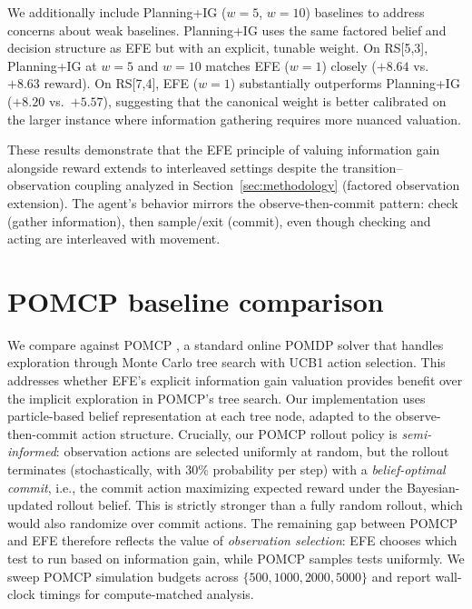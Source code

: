 \documentclass[runningheads]{llncs}
\begin{document}
We additionally include Planning+IG ($w{=}5$, $w{=}10$) baselines to address concerns about weak baselines. Planning+IG uses the same factored belief and decision structure as EFE but with an explicit, tunable weight. On RS[5,3], Planning+IG at $w{=}5$ and $w{=}10$ matches EFE ($w{=}1$) closely ($+8.64$ vs.\ $+8.63$ reward). On RS[7,4], EFE ($w{=}1$) substantially outperforms Planning+IG ($+8.20$ vs.\ $+5.57$), suggesting that the canonical weight is better calibrated on the larger instance where information gathering requires more nuanced valuation.

These results demonstrate that the EFE principle of valuing information gain alongside reward extends to interleaved settings despite the transition--observation coupling analyzed in Section~\ref{sec:methodology} (factored observation extension). The agent's behavior mirrors the observe-then-commit pattern: check (gather information), then sample/exit (commit), even though checking and acting are interleaved with movement.

\section{POMCP baseline comparison}
\label{app:pomcp}

We compare against POMCP \citep{silver2010}, a standard online POMDP solver that handles exploration through Monte Carlo tree search with UCB1 action selection. This addresses whether EFE's explicit information gain valuation provides benefit over the implicit exploration in POMCP's tree search. Our implementation uses particle-based belief representation at each tree node, adapted to the observe-then-commit action structure. Crucially, our POMCP rollout policy is \emph{semi-informed}: observation actions are selected uniformly at random, but the rollout terminates (stochastically, with 30\% probability per step) with a \emph{belief-optimal commit}, i.e., the commit action maximizing expected reward under the Bayesian-updated rollout belief. This is strictly stronger than a fully random rollout, which would also randomize over commit actions. The remaining gap between POMCP and EFE therefore reflects the value of \emph{observation selection}: EFE chooses which test to run based on information gain, while POMCP samples tests uniformly. We sweep POMCP simulation budgets across $\{500, 1000, 2000, 5000\}$ and report wall-clock timings for compute-matched analysis.
\end{document}
